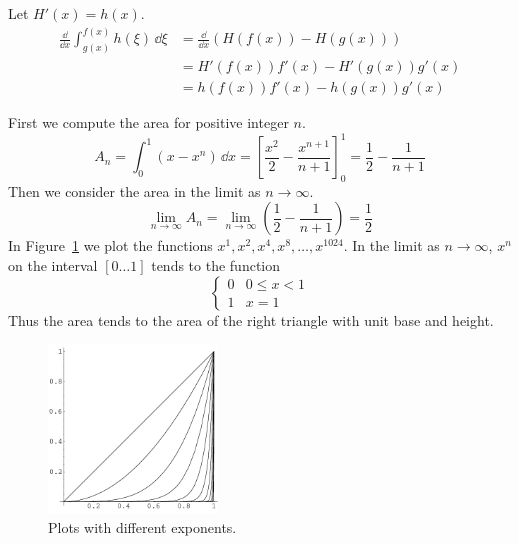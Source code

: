 \begin{Solution}
  \label{solution d/dx int g f h}
  Let $H'(x) = h(x)$.
  \begin{align*}
    \frac{\dd}{\dd x} \int_{g(x)}^{f(x)} h(\xi) \,\dd \xi
    &= \frac{\dd}{\dd x} \left( H(f(x)) - H(g(x)) \right) \\
    &= H'(f(x))f'(x) - H'(g(x))g'(x) \\
    &= h(f(x))f'(x) - h(g(x))g'(x)
  \end{align*}
\end{Solution}



\begin{Solution}
  \label{solution area x xn}
  First we compute the area for positive integer $n$.
  \[
  A_n = \int_0^1 (x - x^n) \,\dd x
  = \left[ \frac{x^2}{2} - \frac{x^{n+1}}{n+1} \right]_0^1
  = \frac{1}{2} - \frac{1}{n+1}
  \]
  Then we consider the area in the limit as $n \to \infty$.
  \[
  \lim_{n \to \infty} A_n
  = \lim_{n \to \infty} \left( \frac{1}{2} - \frac{1}{n+1} \right)
  = \frac{1}{2}
  \]
  In Figure~\ref{figure areaxxn} we plot the functions
  $x^1, x^2, x^4, x^8, \ldots, x^{1024}$.  In the limit as $n \to \infty$, $x^n$ on the interval
  $[0 \ldots 1]$ tends to the function
  \[
  \begin{cases}
    0 &0 \leq x < 1
    \\
    1 &x = 1
  \end{cases}
  \]
  Thus the area tends to the area of the right triangle with unit base and 
  height.
  \begin{figure}[h]
    \begin{center}
      \includegraphics[width=0.4\textwidth]{calculus/integral/areaxxn}
    \end{center}
    \caption{Plots with different exponents.}
    \label{figure areaxxn}
  \end{figure}
\end{Solution}




